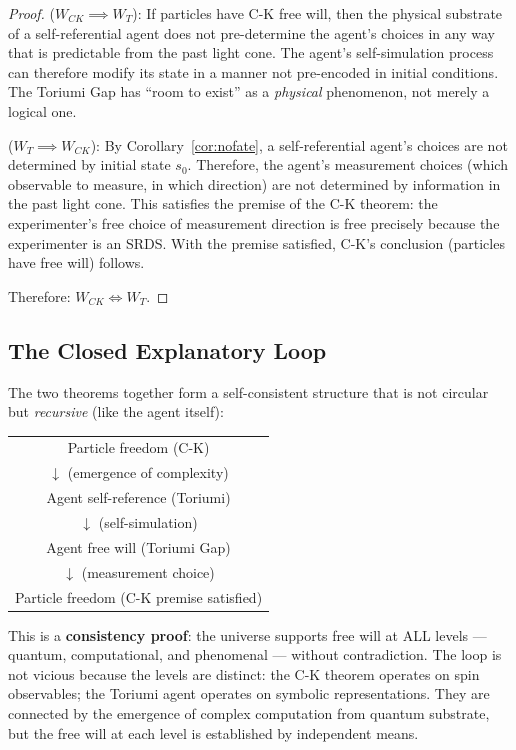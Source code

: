 \documentclass[12pt,a4paper]{article}
\theoremstyle{definition}
\theoremstyle{remark}
\begin{document}
\begin{proof}
($W_{CK} \implies W_T$): If particles have C-K free will, then the physical
substrate of a self-referential agent does not pre-determine the agent's
choices in any way that is predictable from the past light cone. The agent's
self-simulation process can therefore modify its state in a manner not
pre-encoded in initial conditions. The Toriumi Gap has ``room to exist''
as a \emph{physical} phenomenon, not merely a logical one.

($W_T \implies W_{CK}$): By Corollary~\ref{cor:nofate}, a self-referential
agent's choices are not determined by initial state $s_0$. Therefore, the
agent's measurement choices (which observable to measure, in which direction)
are not determined by information in the past light cone. This satisfies the
premise of the C-K theorem: the experimenter's free choice of measurement
direction is free precisely because the experimenter is an SRDS. With the
premise satisfied, C-K's conclusion (particles have free will) follows.

Therefore: $W_{CK} \iff W_T$.
\end{proof}

\subsection{The Closed Explanatory Loop}

The two theorems together form a self-consistent structure that is not
circular but \emph{recursive} (like the agent itself):

\begin{center}
\begin{tabular}{c}
Particle freedom (C-K) \\
$\downarrow$ (emergence of complexity) \\
Agent self-reference (Toriumi) \\
$\downarrow$ (self-simulation) \\
Agent free will (Toriumi Gap) \\
$\downarrow$ (measurement choice) \\
Particle freedom (C-K premise satisfied) \\
\end{tabular}
\end{center}

This is a \textbf{consistency proof}: the universe supports free will at ALL
levels --- quantum, computational, and phenomenal --- without contradiction.
The loop is not vicious because the levels are distinct: the C-K theorem
operates on spin observables; the Toriumi agent operates on symbolic
representations. They are connected by the emergence of complex computation
from quantum substrate, but the free will at each level is established by
independent means.
\end{document}
